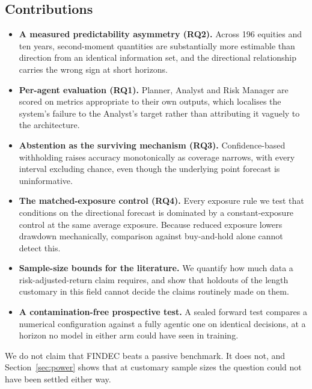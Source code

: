 \documentclass[pdflatex,sn-apa]{sn-jnl}%
\theoremstyle{thmstyleone}%
\theoremstyle{thmstyletwo}%
\theoremstyle{thmstylethree}%
\begin{document}
\subsection{Contributions}\label{subsec:contributions}

\begin{itemize}
\item \textbf{A measured predictability asymmetry (RQ2).} Across 196 equities
and ten years, second-moment quantities are substantially more estimable than
direction from an identical information set, and the directional relationship
carries the wrong sign at short horizons.

\item \textbf{Per-agent evaluation (RQ1).} Planner, Analyst and Risk Manager
are scored on metrics appropriate to their own outputs, which localises the
system's failure to the Analyst's target rather than attributing it vaguely to
the architecture.

\item \textbf{Abstention as the surviving mechanism (RQ3).} Confidence-based
withholding raises accuracy monotonically as coverage narrows, with every
interval excluding chance, even though the underlying point forecast is
uninformative.

\item \textbf{The matched-exposure control (RQ4).} Every exposure rule we test
that conditions on the directional forecast is dominated by a constant-exposure
control at the same average exposure. Because reduced exposure lowers drawdown
mechanically, comparison against buy-and-hold alone cannot detect this.

\item \textbf{Sample-size bounds for the literature.} We quantify how much data
a risk-adjusted-return claim requires, and show that holdouts of the length
customary in this field cannot decide the claims routinely made on them.

\item \textbf{A contamination-free prospective test.} A sealed forward test
compares a numerical configuration against a fully agentic one on identical
decisions, at a horizon no model in either arm could have seen in training.
\end{itemize}

We do not claim that FINDEC beats a passive benchmark. It does not, and
Section~\ref{sec:power} shows that at customary sample sizes the question could
not have been settled either way.
\end{document}

